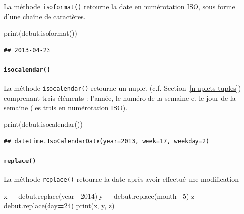 \documentclass[
  12pt,
]{book}
\newenvironment{Shaded}{\begin{snugshade}}{\end{snugshade}}
\newcommand{\BuiltInTok}[1]{#1}
\newcommand{\DecValTok}[1]{\textcolor[rgb]{0.00,0.00,0.81}{#1}}
\newcommand{\NormalTok}[1]{#1}
\newcommand{\OperatorTok}[1]{\textcolor[rgb]{0.81,0.36,0.00}{\textbf{#1}}}
\numberwithin{equation}{section}
\numberwithin{countremarque}{section}
\begin{document}
La méthode \texttt{isoformat()} retourne la date en \href{https://fr.wikipedia.org/wiki/Num\%C3\%A9rotation_ISO_des_semaines}{numérotation ISO}, sous forme d'une chaîne de caractères.

\begin{Shaded}
\begin{Highlighting}[]
\BuiltInTok{print}\NormalTok{(debut.isoformat())}
\end{Highlighting}
\end{Shaded}

\begin{lstlisting}
## 2013-04-23
\end{lstlisting}

\paragraph{\texorpdfstring{\texttt{isocalendar()}}{isocalendar()}}\label{isocalendar}

La méthode \texttt{isocalendar()} retourne un nuplet (c.f. Section~\ref{n-uplets-tuples}) comprenant trois éléments : l'année, le numéro de la semaine et le jour de la semaine (les trois en numérotation ISO).

\begin{Shaded}
\begin{Highlighting}[]
\BuiltInTok{print}\NormalTok{(debut.isocalendar())}
\end{Highlighting}
\end{Shaded}

\begin{lstlisting}
## datetime.IsoCalendarDate(year=2013, week=17, weekday=2)
\end{lstlisting}

\paragraph{\texorpdfstring{\texttt{replace()}}{replace()}}\label{replace}

La méthode \texttt{replace()} retourne la date après avoir effectué une modification

\begin{Shaded}
\begin{Highlighting}[]
\NormalTok{x }\OperatorTok{=}\NormalTok{ debut.replace(year}\OperatorTok{=}\DecValTok{2014}\NormalTok{)}
\NormalTok{y }\OperatorTok{=}\NormalTok{ debut.replace(month}\OperatorTok{=}\DecValTok{5}\NormalTok{)}
\NormalTok{z }\OperatorTok{=}\NormalTok{ debut.replace(day}\OperatorTok{=}\DecValTok{24}\NormalTok{)}
\BuiltInTok{print}\NormalTok{(x, y, z)}
\end{Highlighting}
\end{Shaded}
\end{document}
